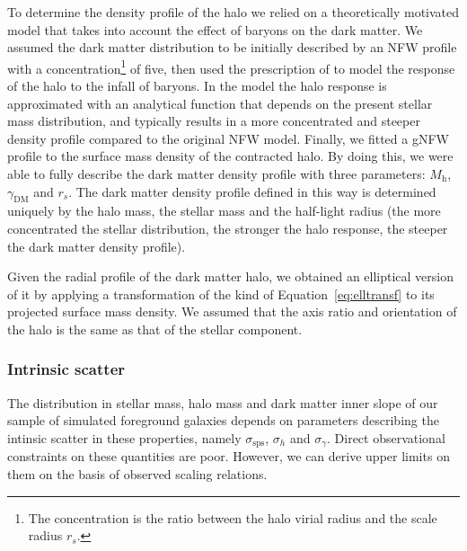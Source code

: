 \documentclass{aa}
\def\gammadm{\gamma_{\mathrm{DM}}}
\def\mhalo{M_{\mathrm{h}}}
\def\Eref#1{Equation~\ref{#1}\xspace}
\begin{document}
To determine the density profile of the halo we relied on a theoretically motivated model that takes into account the effect of baryons on the dark matter.
We assumed the dark matter distribution to be initially described by an NFW profile with a concentration\footnote{The concentration is the ratio between the halo virial radius and the scale radius $r_s$.} of five, then used the prescription of \citet{Cau++20} to model the response of the halo to the infall of baryons. %
In the \citet{Cau++20} model the halo response is approximated with an analytical function that depends on the present stellar mass distribution, and typically results in a more concentrated and steeper density profile compared to the original NFW model. 
Finally, we fitted a gNFW profile to the surface mass density of the contracted halo. By doing this, we were able to fully describe the dark matter density profile with three parameters: $\mhalo$, $\gammadm$ and $r_s$.
%
The dark matter density profile defined in this way is determined uniquely by the halo mass, the stellar mass and the half-light radius (the more concentrated the stellar distribution, the stronger the halo response, the steeper the dark matter density profile).

Given the radial profile of the dark matter halo, we obtained an elliptical version of it by applying a transformation of the kind of \Eref{eq:elltransf} to its projected surface mass density.
We assumed that the axis ratio and orientation of the halo is the same as that of the stellar component.

\subsubsection{Intrinsic scatter}\label{ssub:scat}

The distribution in stellar mass, halo mass and dark matter inner slope of our sample of simulated foreground galaxies depends on parameters describing the intinsic scatter in these properties, namely $\sigma_{\mathrm{sps}}$, $\sigma_h$ and $\sigma_{\gamma}$.
Direct observational constraints on these quantities are poor.
However, we can derive upper limits on them on the basis of observed scaling relations.
\end{document}
